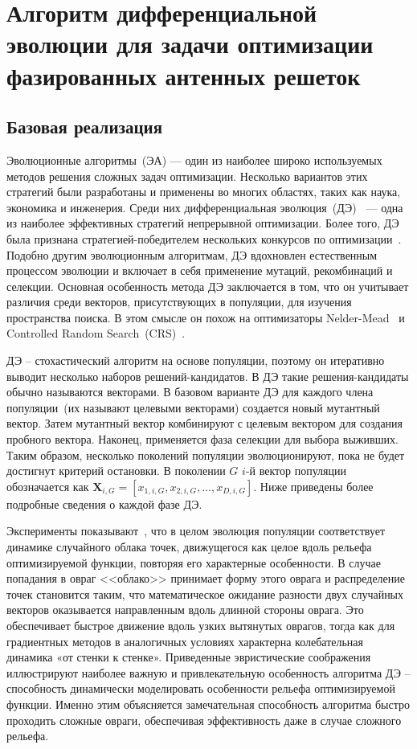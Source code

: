 \chapter{Алгоритм дифференциальной эволюции для задачи оптимизации фазированных антенных решеток}\label{sec:radio}

\section{Базовая реализация}\label{sec:de:default}

Эволюционные алгоритмы~(ЭА) — один из наиболее широко используемых методов решения сложных задач оптимизации. Несколько вариантов этих стратегий были разработаны и применены во многих областях, таких как наука, экономика и инженерия. Среди них дифференциальная эволюция~(ДЭ)~\cite{storn:de} — одна из наиболее эффективных стратегий непрерывной оптимизации. Более того, ДЭ была признана стратегией-победителем нескольких конкурсов по оптимизации~\cite{das:de}. Подобно другим эволюционным алгоритмам, ДЭ вдохновлен естественным процессом эволюции и включает в себя применение мутаций, рекомбинаций и селекции. Основная особенность метода ДЭ заключается в том, что он учитывает различия среди векторов, присутствующих в популяции, для изучения пространства поиска. В этом смысле он похож на оптимизаторы Nelder-Mead~\cite{nelder:simplex} и Controlled Random Search~(CRS)~\cite{price:global}.

ДЭ -- стохастический алгоритм на основе популяции, поэтому он итеративно выводит несколько наборов решений-кандидатов. В ДЭ такие решения-кандидаты обычно называются векторами. В базовом варианте ДЭ для каждого члена популяции~(их называют целевыми векторами) создается новый мутантный вектор. Затем мутантный вектор комбинируют с целевым вектором для создания пробного вектора. Наконец, применяется фаза селекции для выбора выживших. Таким образом, несколько поколений популяции эволюционируют, пока не будет достигнут критерий остановки. В поколении $G$ $i$-й вектор популяции обозначается как $\textbf{X}_{i,G} = [x_{1,i,G}, x_{2,i,G}, ..., x_{D,i,G}]$. Ниже приведены более подробные сведения о каждой фазе ДЭ.

Эксперименты показывают~\cite{storn:de_practical}, что в целом эволюция популяции соответствует динамике случайного облака точек, движущегося как целое вдоль рельефа оптимизируемой функции, повторяя его характерные особенности. В случае попадания в овраг <<облако>> принимает форму этого оврага и распределение точек становится таким, что математическое ожидание разности двух случайных векторов оказывается направленным вдоль длинной стороны оврага. Это обеспечивает быстрое движение вдоль узких вытянутых оврагов, тогда как для градиентных методов в аналогичных условиях характерна колебательная динамика «от стенки к стенке». Приведенные эвристические соображения иллюстрируют наиболее важную и привлекательную особенность алгоритма ДЭ -- способность динамически моделировать особенности рельефа оптимизируемой функции. Именно этим объясняется замечательная способность алгоритма быстро проходить сложные овраги, обеспечивая эффективность даже в случае сложного рельефа.

